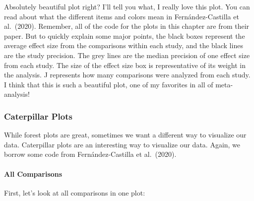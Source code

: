 \documentclass[
]{book}
\begin{document}
Absolutely beautiful plot right? I'll tell you what, I really love this plot. You can read about what the different items and colors mean in Fernández-Castilla et al.~(2020)\citep{fernández-castilla2020}. Remember, all of the code for the plots in this chapter are from their paper. But to quickly explain some major points, the black boxes represent the average effect size from the comparisons within each study, and the black lines are the study precision. The grey lines are the median precision of one effect size from each study. The size of the effect size box is representative of its weight in the analysis. J represents how many comparisons were analyzed from each study. I think that this is such a beautiful plot, one of my favorites in all of meta-analysis!

\hypertarget{caterpillar-plots}{%
\subsubsection{Caterpillar Plots}\label{caterpillar-plots}}

While forest plots are great, sometimes we want a different way to visualize our data. Caterpillar plots are an interesting way to visualize our data. Again, we borrow some code from Fernández-Castilla et al.~(2020)\citep{fernández-castilla2020}.

\hypertarget{all-comparisons}{%
\paragraph{All Comparisons}\label{all-comparisons}}

First, let's look at all comparisons in one plot:
\end{document}
